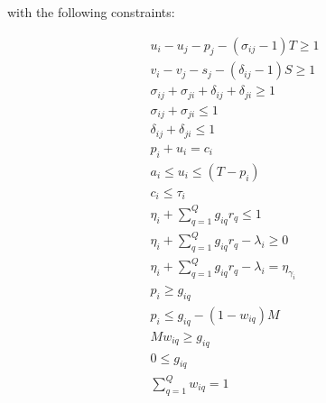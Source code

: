 \documentclass[letterpaper, 10pt, conference]{IEEEtran}
\begin{document}
with the following constraints:
    
\begin{subequations}
\begin{align}
    u_i - u_j - p_j - (\sigma_{ij} - 1)T \geq 1                     \label{subeq:time}         \\
    v_i - v_j - s_j - (\delta_{ij} - 1)S \geq 1                     \label{subeq:space}        \\
    \sigma_{ij} + \sigma_{ji} + \delta_{ij} + \delta_{ji} \geq 1    \label{subeq:valid_pos}    \\
    \sigma_{ij} + \sigma_{ji} \leq 1                                \label{subeq:sigma}        \\
    \delta_{ij} + \delta_{ji} \leq 1                                \label{subeq:delta}        \\
    p_i + u_i = c_i                                                 \label{subeq:detach}       \\
    a_i \leq u_i \leq (T - p_i)                                     \label{subeq:valid_starts} \\
    c_i \leq \tau_i                                                 \label{subeq:valid_depart} \\
    \eta_i + \sum_{q=1}^Q g_{iq} r_q \leq 1                         \label{subeq:max_charge}   \\
    \eta_i + \sum_{q=1}^Q g_{iq} r_q - \lambda_i \geq 0             \label{subeq:min_charge}   \\
    \eta_i + \sum_{q=1}^Q g_{iq} r_q - \lambda_i = \eta_{\gamma_i}  \label{subeq:next_charge}  \\
    p_i \geq g_{iq}                                                 \label{subeq:gpgret}       \\
    p_i \leq g_{iq} - (1 - w_{iq})M                                 \label{subeq:gpsmol}       \\
    Mw_{iq} \geq g_{iq}                                             \label{subeq:gwgret}       \\
    0 \leq g_{iq}                                                   \label{subeq:gwsmol}       \\
    \sum_{q=1}^Q w_{iq} = 1                                         \label{subeq:wmax} 
\end{align}
\end{subequations}
\end{document}
